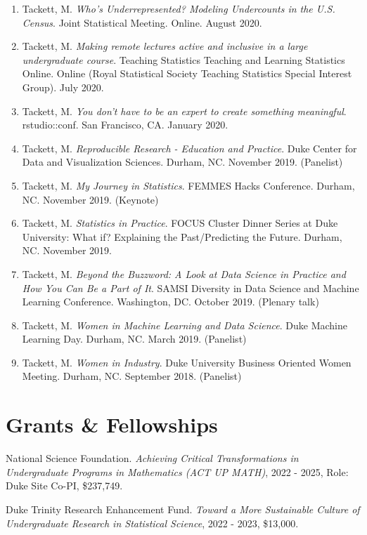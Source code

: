 \documentclass[11pt,dvipsnames]{article}
\begin{document}
\begin{enumerate}
{  Lightning Talks (Academia, Government, \& NonProfit)}. StatFest.
  Online. September 2020. (Panelist)
\item
  Tackett, M. \emph{Who's Underrepresented? Modeling Undercounts in the
  U.S. Census}. Joint Statistical Meeting. Online. August 2020.
\item
  Tackett, M. \emph{Making remote lectures active and inclusive in a
  large undergraduate course}. Teaching Statistics Teaching and Learning
  Statistics Online. Online (Royal Statistical Society Teaching
  Statistics Special Interest Group). July 2020.
\item
  Tackett, M. \emph{You don't have to be an expert to create something
  meaningful}. rstudio::conf. San Francisco, CA. January 2020.
\item
  Tackett, M. \emph{Reproducible Research - Education and Practice}.
  Duke Center for Data and Visualization Sciences. Durham, NC. November
  2019. (Panelist)
\item
  Tackett, M. \emph{My Journey in Statistics}. FEMMES Hacks Conference.
  Durham, NC. November 2019. (Keynote)
\item
  Tackett, M. \emph{Statistics in Practice}. FOCUS Cluster Dinner Series
  at Duke University: What if? Explaining the Past/Predicting the
  Future. Durham, NC. November 2019.
\item
  Tackett, M. \emph{Beyond the Buzzword: A Look at Data Science in
  Practice and How You Can Be a Part of It}. SAMSI Diversity in Data
  Science and Machine Learning Conference. Washington, DC. October 2019.
  (Plenary talk)
\item
  Tackett, M. \emph{Women in Machine Learning and Data Science}. Duke
  Machine Learning Day. Durham, NC. March 2019. (Panelist)
\item
  Tackett, M. \emph{Women in Industry}. Duke University Business
  Oriented Women Meeting. Durham, NC. September 2018. (Panelist)
\end{enumerate}

\hypertarget{grants-fellowships}{%
\section{Grants \& Fellowships}\label{grants-fellowships}}

National Science Foundation. \emph{Achieving Critical Transformations in
Undergraduate Programs in Mathematics (ACT UP MATH)}, 2022 - 2025, Role:
Duke Site Co-PI, \$237,749.

Duke Trinity Research Enhancement Fund. \emph{Toward a More Sustainable
Culture of Undergraduate Research in Statistical Science}, 2022 - 2023,
\$13,000.
\end{document}
